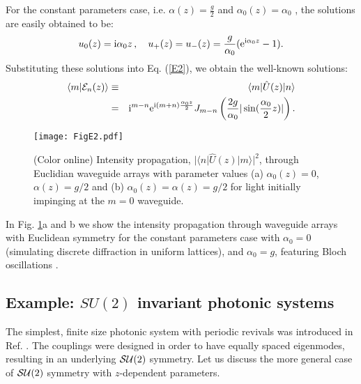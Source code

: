 \documentclass[12pt]{iopart}
\newcommand{\bra}[1]{ \langle #1|}
\newcommand{\ket}[1]{ |#1\rangle}
\newcommand{\prodesc}[2]{ \langle #1|#2\rangle}
\begin{document}
For the constant parameters case, i.e. $\alpha(z)=\frac{g}{2}$  and $\alpha_0(z)=\alpha_0$ , the solutions are easily obtained to be:
%
\begin{equation}
u_0(z)= {\rm i} \alpha_{0} z    \,,\quad  u_+(z)=u_-(z)=\frac{g}{\alpha_{0}}({\rm e}^{{\rm i} \alpha_{0} z}-1) .
\end{equation}
%
%
Substituting these solutions into Eq. (\ref{E2}), we obtain the well-known solutions:
%
\begin{eqnarray}
 \prodesc{m}{{\cal E}_n(z)}&\equiv&\bra{m}\hat{U}(z)\ket{n} \\
&=& {\rm i}^{m-n} {\rm e}^{{\rm i} (m+n) \frac{\alpha_{0} z}{2}}  J_{m-n}\left(\frac{2g}{\alpha_{0}}|\sin(\frac{\alpha_{0}}{2}z)|\right). \nonumber
\end{eqnarray}


\begin{figure}
\center 	\texttt{[image: FigE2.pdf]}
	\caption{(Color online) Intensity propagation, $|\bra{n}\hat{U}(z)\ket{m}|^2$, through Euclidian waveguide arrays with parameter values (a) $\alpha_{0}(z) = 0 $, $\alpha(z) = g/2$ and (b) $\alpha_{0}(z) = \alpha(z) = g/2$ for light initially impinging at the $m=0$ waveguide.}
	\label{fig:E2}
\end{figure}


In Fig. \ref{fig:E2}a and b we show the intensity propagation through waveguide arrays with Euclidean symmetry for the constant parameters case with $\alpha_{0}=0$  (simulating discrete diffraction in uniform lattices), and $\alpha_{0}=g$, featuring Bloch oscillations \cite{Bessel}.


\subsection{Example: $SU(2)$ invariant photonic systems}


The simplest, finite size photonic system with periodic revivals was introduced in Ref. \cite{Gordon}. The couplings were
designed in order to have equally spaced eigenmodes, resulting in  an underlying ${\cal SU}(2)$
symmetry. Let us discuss the more general case of ${\cal SU}(2)$ symmetry with $z$-dependent
parameters.
\end{document}
